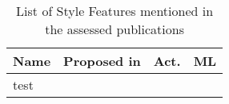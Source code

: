 \begin{table}[htbp]
    \caption{List of Style Features mentioned in the assessed publications}
    \label{tab:feat_Style}
    \centering
    \begin{tabular}{m{} m{} c c}
        \toprule
        \textbf{Name} & \textbf{Proposed in} & \textbf{Act.} & \textbf{ML} \\ 
        \midrule
        test
        \bottomrule
    \end{tabular}
\end{table}